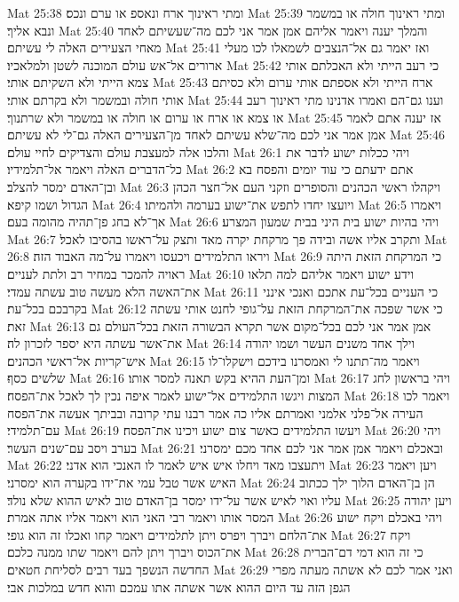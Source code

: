 Mat 25:38  ומתי ראינוך ארח ונאספ או ערם ונכס׃
Mat 25:39  ומתי ראינוך חולה או במשמר ונבא אליך׃
Mat 25:40  והמלך יענה ויאמר אליהם אמן אמר אני לכם מה־שעשיתם לאחד מאחי הצעירים האלה לי עשיתם׃
Mat 25:41  ואז יאמר גם אל־הנצבים לשמאלו לכו מעלי ארורים אל־אש עולם המוכנה לשטן ולמלאכיו׃
Mat 25:42  כי רעב הייתי ולא האכלתם אותי צמא הייתי ולא השקיתם אותי׃
Mat 25:43  ארח הייתי ולא אספתם אותי ערום ולא כסיתם אותי חולה ובמשמר ולא בקרתם אותי׃
Mat 25:44  וענו גם־הם ואמרו אדנינו מתי ראינוך רעב או צמא או ארח או ערום או חולה או במשמר ולא שרתנוך׃
Mat 25:45  אז יענה אתם לאמר אמן אמר אני לכם מה־שלא עשיתם לאחד מן־הצעירים האלה גם־לי לא עשיתם׃
Mat 25:46  והלכו אלה למעצבת עולם והצדיקים לחיי עולם׃
Mat 26:1  ויהי ככלות ישוע לדבר את כל־הדברים האלה ויאמר אל־תלמידיו׃
Mat 26:2  אתם ידעתם כי עוד יומים והפסח בא ובן־האדם ימסר להצלב׃
Mat 26:3  ויקהלו ראשי הכהנים והסופרים וזקני העם אל־חצר הכהן הגדול ושמו קיפא׃
Mat 26:4  ויועצו יחדו לתפש את־ישוע בערמה ולהמיתו׃
Mat 26:5  ויאמרו אך־לא בחג פן־תהיה מהומה בעם׃
Mat 26:6  ויהי בהיות ישוע בית היני בבית שמעון המצרע׃
Mat 26:7  ותקרב אליו אשה ובידה פך מרקחת יקרה מאד ותצק על־ראשו בהסיבו לאכל׃
Mat 26:8  ויראו התלמידים ויכעסו ויאמרו על־מה האבוד הזה׃
Mat 26:9  כי המרקחת הזאת היתה ראויה להמכר במחיר רב ולתת לעניים׃
Mat 26:10  וידע ישוע ויאמר אליהם למה תלאו את־האשה הלא מעשה טוב עשתה עמדי׃
Mat 26:11  כי העניים בכל־עת אתכם ואנכי אינני בקרבכם בכל־עת׃
Mat 26:12  כי אשר שפכה את־המרקחת הזאת על־גופי לחנט אותי עשתה זאת׃
Mat 26:13  אמן אמר אני לכם בכל־מקום אשר תקרא הבשורה הזאת בכל־העולם גם את־אשר עשתה היא יספר לזכרון לה׃
Mat 26:14  וילך אחד משנים העשר ושמו יהודה איש־קריות אל־ראשי הכהנים׃
Mat 26:15  ויאמר מה־תתנו לי ואמסרנו בידכם וישקלו־לו שלשים כסף׃
Mat 26:16  ומן־העת ההיא בקש תאנה למסר אותו׃
Mat 26:17  ויהי בראשון לחג המצות ויגשו התלמידים אל־ישוע לאמר איפה נכין לך לאכל את־הפסח׃
Mat 26:18  ויאמר לכו העירה אל־פלני אלמני ואמרתם אליו כה אמר רבנו עתי קרובה ובביתך אעשה את־הפסח עם־תלמידי׃
Mat 26:19  ויעשו התלמידים כאשר צום ישוע ויכינו את־הפסח׃
Mat 26:20  ויהי בערב ויסב עם־שנים העשר׃
Mat 26:21  ובאכלם ויאמר אמן אמר אני לכם אחד מכם ימסרני׃
Mat 26:22  ויתעצבו מאד ויחלו איש איש לאמר לו האנכי הוא אדני׃
Mat 26:23  ויען ויאמר האיש אשר טבל עמי את־ידו בקערה הוא ימסרני׃
Mat 26:24  הן בן־האדם הלוך ילך ככתוב עליו ואוי לאיש אשר על־ידו ימסר בן־האדם טוב לאיש ההוא שלא נולד׃
Mat 26:25  ויען יהודה המסר אותו ויאמר רבי האני הוא ויאמר אליו אתה אמרת׃
Mat 26:26  ויהי באכלם ויקח ישוע את־הלחם ויברך ויפרס ויתן לתלמידים ויאמר קחו ואכלו זה הוא גופי׃
Mat 26:27  ויקח את־הכוס ויברך ויתן להם ויאמר שתו ממנה כלכם׃
Mat 26:28  כי זה הוא דמי דם־הברית החדשה הנשפך בעד רבים לסליחת חטאים׃
Mat 26:29  ואני אמר לכם לא אשתה מעתה מפרי הגפן הזה עד היום ההוא אשר אשתה אתו עמכם והוא חדש במלכות אבי׃
